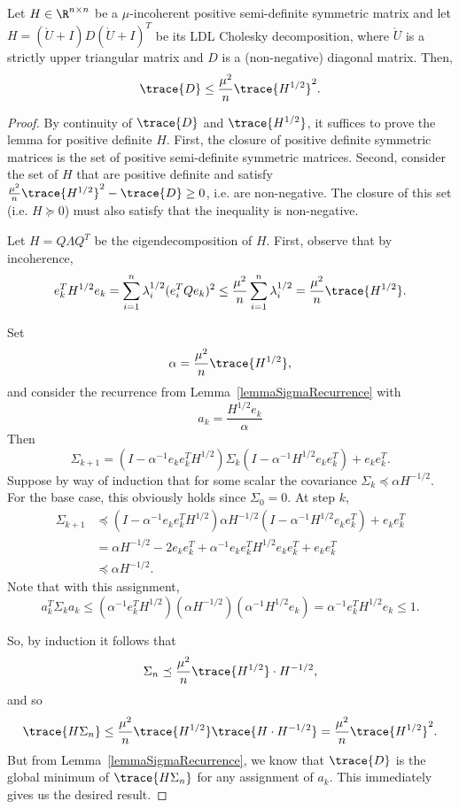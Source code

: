 \begin{lemmarep}\label{lemDincoherentBd}
Let $H \in \R^{n \times n}$ be a $\mu$-incoherent positive semi-definite symmetric matrix
and let $H = (\grave U + I) D (\grave U + I)^T$ be its LDL Cholesky decomposition, where $\grave U$ is a strictly upper triangular matrix and $D$ is a (non-negative) diagonal matrix. Then,
\[
    \trace{D} \le \frac{\mu^2}{n} \trace{ H^{1/2} }^2.
\]
\end{lemmarep}
\begin{proof}
By continuity of $\trace{D}$ and $\trace{H^{1/2}}$, it suffices to prove the lemma for positive definite $H$.
First, the closure of positive definite symmetric matrices is the set of positive semi-definite symmetric matrices.
Second, consider the set of $H$ that are positive definite and satisfy $\frac{\mu^2}{n} \trace{H^{1/2}}^2 - \trace{D} \geq 0$, i.e. are non-negative.
The closure of this set (i.e. $H \succeq 0$) must also satisfy that the inequality is non-negative.

Let $H = Q \Lambda Q^T$ be the eigendecomposition of $H$.
First, observe that by incoherence,
\[
    e_k^T H^{1/2} e_k
    =
    \sum_{i=1}^n \lambda_i^{1/2} (e_i^T Q e_k)^2
    \le
    \frac{\mu^2}{n} \sum_{i=1}^n \lambda_i^{1/2}
    =
    \frac{\mu^2}{n} \trace{H^{1/2}}.
\]

Set
\[
    \alpha = \frac{\mu^2}{n} \trace{H^{1/2}},
\]
and consider the recurrence from Lemma~\ref{lemmaSigmaRecurrence} with
\[
    a_k = \frac{H^{1/2} e_k}{\alpha}
\]
Then
\[
    \Sigma_{k+1} = \left(I - \alpha^{-1} e_k e_k^T H^{1/2} \right) \Sigma_k \left(I - \alpha^{-1}H^{1/2} e_k e_k^T \right) + e_k e_k^T.
\]
Suppose by way of induction that for some scalar the covariance $\Sigma_k \preceq \alpha H^{-1/2}$. For the base case, this obviously holds since $\Sigma_0 = 0$. At step $k$,
\begin{align*}
    \Sigma_{k+1} 
    &\preceq
     \left(I - \alpha^{-1} e_k e_k^T H^{1/2} \right) \alpha H^{-1/2} \left(I - \alpha^{-1}H^{1/2} e_k e_k^T \right) + e_k e_k^T
    \\&=
    \alpha H^{-1/2} - 
    2 e_k e_k^T
    +
    \alpha^{-1} e_k e_k^T H^{1/2} e_k e_k^T
    +
    e_k e_k^T
    \\&\preceq
    \alpha H^{-1/2}.
\end{align*}
Note that with this assignment,
\[
    a_k^T \Sigma_k a_k
    \le
    (\alpha^{-1} e_k^T H^{1/2}) (\alpha H^{-1/2}) (\alpha^{-1} H^{1/2} e_k)
    =
    \alpha^{-1} e_k^T H^{1/2} e_k
    \le
    1.
\]


So, by induction it follows that
\[
    \Sigma_n \preceq \frac{\mu^2}{n} \trace{H^{1/2}} \cdot H^{-1/2},
\]
and so
\[
    \trace{H \Sigma_n} \le \frac{\mu^2}{n} \trace{H^{1/2}} \trace{H \cdot H^{-1/2}}
    = \frac{\mu^2}{n} \trace{H^{1/2}}^2.
\]
But from Lemma~\ref{lemmaSigmaRecurrence}, we know that $\trace{D}$ is the global minimum of $\trace{H \Sigma_n}$ for any assignment of $a_k$. This immediately gives us the desired result.
\end{proof}
